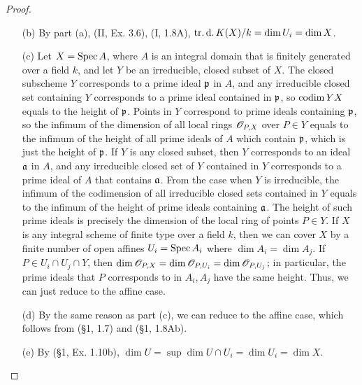 \documentclass{article}
\begin{document}
\begin{enumerate} [label=\textbf{\arabic*.}, leftmargin=0em]
\begin{proof}
\begin{itemize} [leftmargin=0cm]
    \item[(b)] By part (a), (II, Ex. 3.6), (I, 1.8A), $\operatorname{tr.d.}{K(X)} / k = \dim{U_i} = \dim{X}$.

    \item[(c)] Let $X = \operatorname{Spec}{A}$, where $A$ is an integral domain that is finitely generated over a field $k$, and let $Y$ be an irreducible, closed subset of $X$.
    The closed subscheme $Y$ corresponds to a prime ideal $\mathfrak{p}$ in $A$, and any irreducible closed set containing $Y$ corresponds to a prime ideal contained in $\mathfrak{p}$, so $\operatorname{codim}{Y}{X}$ equals to the height of $\mathfrak{p}$. Points in $Y$ correspond to prime ideals containing $\mathfrak{p}$, so the infimum of the dimension of all local rings $\mathscr{O}_{P, X}$ over $P \in Y$ equals to the infimum of the height of all prime ideals of $A$ which contain $\mathfrak{p}$, which is just the height of $\mathfrak{p}$. If $Y$ is any closed subset, then $Y$ corresponds to an ideal $\mathfrak{a}$ in $A$, and any irreducible closed set of $Y$ contained in $Y$ corresponds to a prime ideal of $A$ that contains $\mathfrak{a}$. From the case when $Y$ is irreducible, the infimum of the codimension of all irreducible closed sets contained in $Y$ equals to the infimum of the height of prime ideals containing $\mathfrak{a}$. The height of such prime ideals is precisely the dimension of the local ring of points $P \in Y$. If $X$ is any integral scheme of finite type over a field $k$, then we can cover $X$ by a finite number of open affines $U_i = \operatorname{Spec}{A_i}$ where $\dim{A_i} = \dim{A_j}$. If $P \in U_i \cap U_j \cap Y$, then $\dim{\mathscr{O}_{P, X}} = \dim{\mathscr{O}_{P, U_i}} = \dim{\mathscr{O}_{P, U_j}}$; in particular, the prime ideals that $P$ corresponds to in $A_i, A_j$ have the same height. Thus, we can just reduce to the affine case.
    
    \item[(d)] By the same reason as part (c), we can reduce to the affine case, which follows from (\S 1, 1.7) and (\S 1, 1.8Ab). 

    \item[(e)] By (\S 1, Ex. 1.10b), $\dim{U} = \sup{\dim{U \cap U_i}} = \dim{U_i} = \dim{X}$. 


\end{itemize}
\end{proof}
\end{enumerate}
\end{document}
